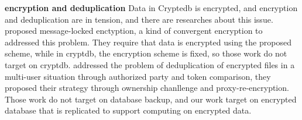 

\textbf{encryption and deduplication} Data in Cryptedb is encrypted, and encryption and deduplication are in tension, and there are researches about this issue.\citep{bellare2013message} \citep{puzio2015perfectdedup} proposed message-locked enctyption, a kind of convergent encryption to addressed this problem. They require that data is encrypted using the proposed scheme, while in cryptdb, the encryption scheme is fixed, so those work do not target on cryptdb. \citep{yan2016deduplication} addressed the problem of deduplication of encrypted files in a multi-user situation through authorized party and token comparison, they proposed their strategy through ownership chanllenge and proxy-re-encryption. Those work do not target on database backup, and our work target on encrypted database that is replicated to support computing on encrypted data.










